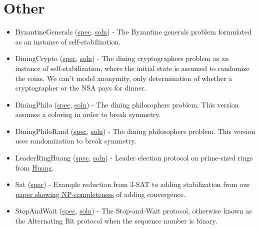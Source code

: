 \section{Other}

\begin{itemize}
\item ByzantineGenerals (\href{\examplespec/ByzantineGenerals.prot}{spec}, \href{\examplesoln/ByzantineGenerals.prot}{soln})
- The Byzantine generals problem formulated as an instance of self-stabilization.
\item DiningCrypto (\href{\examplespec/DiningCrypto.prot}{spec}, \href{\examplesoln/DiningCrypto.prot}{soln})
- The dining cryptographers problem as an instance of self-stabilization, where the initial state is assumed to randomize the coins.
We can't model anonymity, only determination of whether a cryptographer or the NSA pays for dinner.
\item DiningPhilo (\href{\examplespec/DiningPhilo.prot}{spec}, \href{\examplesoln/DiningPhilo.prot}{soln})
- The dining philosophers problem. This version assumes a coloring in order to break symmetry.
\item DiningPhiloRand (\href{\examplespec/DiningPhiloRand.prot}{spec}, \href{\examplesoln/DiningPhiloRand.prot}{soln})
- The dining philosophers problem. This version uses randomization to break symmetry.
\item LeaderRingHuang (\href{\examplespec/LeaderRingHuang.prot}{spec}, \href{\examplesoln/LeaderRingHuang.prot}{soln})
- Leader election protocol on prime-sized rings from \href{http://dx.doi.org/10.1145/169683.174161}{Huang}.
\item Sat (\href{\examplespec/Sat.prot}{spec})
- Example reduction from 3-SAT to adding stabilization from our \href{http://dx.doi.org/10.1007/978-3-642-40213-5_2}{paper showing NP-completeness} of adding convergence.
\item StopAndWait (\href{\examplespec/StopAndWait.prot}{spec}, \href{\examplesoln/StopAndWait.prot}{soln})
- The Stop-and-Wait protocol, otherwise known as the Alternating Bit protocol when the sequence number is binary.
\end{itemize}



